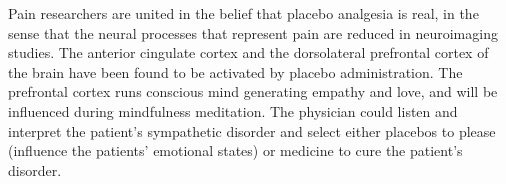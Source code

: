 \documentclass[jpm,article,submit,moreauthors,pdftex]{Definitions/mdpi}
\begin{document}
\begin{paracol}{2}
Pain researchers are united in the belief that placebo analgesia is real, in the sense that the neural processes that represent pain are reduced in neuroimaging studies\cite{Bennett2018}. 
The anterior cingulate cortex and the dorsolateral prefrontal cortex of the brain have been found to be activated by placebo administration\cite{Benedetti2005}\cite{Benedetti2011}\cite{Carlino2011}\cite{Bennett2018}. 
The prefrontal cortex runs conscious mind generating empathy and love, and will be influenced during mindfulness meditation\cite{Krummenacher2010}\cite{Bennett2018}.
The physician could listen and interpret the patient's sympathetic disorder and select either placebos to please (influence the patients' emotional states) or medicine to cure the patient's disorder.

\end{paracol}
\end{document}
